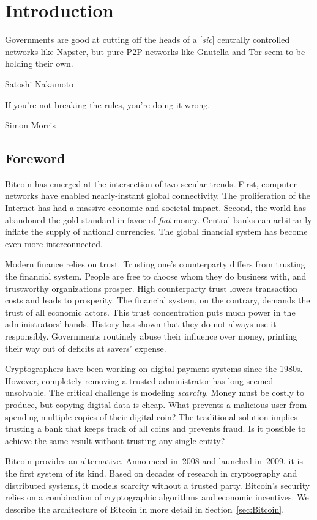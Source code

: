 \chapter{Introduction}

\label{Chapter01Introduction}

\epigraph{Governments are good at cutting off the heads of a [\textit{sic}] centrally controlled networks like Napster, but pure P2P networks like Gnutella and Tor seem to be holding their own.}{Satoshi Nakamoto~\cite{Nakamoto2008}}
\epigraph{If you're not breaking the rules, you're doing it wrong.}{Simon Morris~\cite{Morris2018}}


\section{Foreword}

Bitcoin has emerged at the intersection of two secular trends.
First, computer networks have enabled nearly-instant global connectivity.
The proliferation of the Internet has had a massive economic and societal impact.
Second, the world has abandoned the gold standard in favor of \textit{fiat} money.
Central banks can arbitrarily inflate the supply of national currencies.
The global financial system has become even more interconnected.

Modern finance relies on trust.
Trusting one's counterparty differs from trusting the financial system.
People are free to choose whom they do business with, and trustworthy organizations prosper.
High counterparty trust lowers transaction costs and leads to prosperity.
The financial system, on the contrary, demands the trust of all economic actors.
This trust concentration puts much power in the administrators' hands.
History has shown that they do not always use it responsibly.
Governments routinely abuse their influence over money, printing their way out of deficits at savers' expense.

Cryptographers have been working on digital payment systems since the 1980s.
However, completely removing a trusted administrator has long seemed unsolvable.
The critical challenge is modeling \textit{scarcity}.
Money must be costly to produce, but copying digital data is cheap.
What prevents a malicious user from spending multiple copies of their digital coin?
The traditional solution implies trusting a bank that keeps track of all coins and prevents fraud.
Is it possible to achieve the same result without trusting any single entity?

Bitcoin provides an alternative.
Announced in~2008 and launched in~2009, it is the first system of its kind.
Based on decades of research in cryptography and distributed systems, it models scarcity without a trusted party.
Bitcoin's security relies on a combination of cryptographic algorithms and economic incentives.
We describe the architecture of Bitcoin in more detail in Section~\ref{sec:Bitcoin}.

